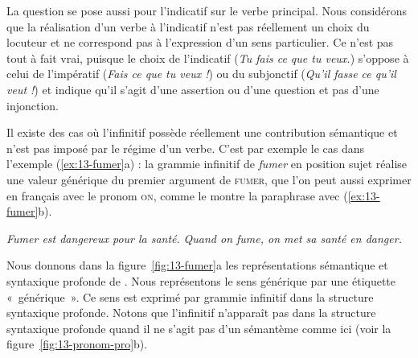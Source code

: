 La question se pose aussi pour l’indicatif sur le verbe principal. Nous considérons que la réalisation d’un verbe à l’indicatif n’est pas réellement un choix du locuteur et ne correspond pas à l’expression d’un sens particulier. Ce n’est pas tout à fait vrai, puisque le choix de l’indicatif (\textit{Tu fais ce que tu veux.}) s’oppose à celui de l’impératif (\textit{Fais ce que tu veux !}) ou du subjonctif (\textit{Qu’il fasse ce qu’il veut !}) et indique qu’il s’agit d’une assertion ou d’une question et pas d’une injonction.

Il existe des cas où l’infinitif possède réellement une contribution sémantique et n’est pas imposé par le régime d’un verbe. C’est par exemple le cas dans l’exemple (\ref{ex:13-fumer}a) : la grammie infinitif de \textit{fumer} en position sujet réalise une valeur générique du premier argument de \textsc{fumer}, que l’on peut aussi exprimer en français avec le pronom \textsc{on}, comme le montre la paraphrase avec (\ref{ex:13-fumer}b). 

\ea\label{ex:13-fumer}
\ea \textit{Fumer est dangereux pour la santé.}
\ex \textit{Quand on fume, on met sa santé en danger.}\z\z
\begin{sloppypar}
Nous donnons dans la figure~\ref{fig:13-fumer}a les représentations sémantique et syntaxique profonde de . Nous représentons le sens générique par une étiquette «~générique~». Ce sens est exprimé par grammie infinitif dans la structure syntaxique profonde. Notons que l’infinitif n’apparaît pas dans la structure syntaxique profonde quand il ne s’agit pas d’un sémantème comme ici (voir la figure~\ref{fig:13-pronom-pro}b).
\end{sloppypar}

